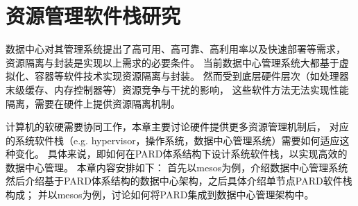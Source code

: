 

\chapter{资源管理软件栈研究}
\label{chap:prm}


数据中心对其管理系统提出了高可用、高可靠、高利用率以及快速部署等需求，
资源隔离与封装是实现以上需求的必要条件。
当前数据中心管理系统大都基于虚拟化、容器等软件技术实现资源隔离与封装。
然而受到底层硬件层次（如处理器末级缓存、内存控制器等）资源竞争与干扰的影响，
这些软件方法无法实现性能隔离，需要在硬件上提供资源隔离机制。


计算机的软硬需要协同工作，本章主要讨论硬件提供更多资源管理机制后，
对应的系统软件栈（e.g. hypervisor，操作系统，数据中心管理系统）需要如何适应这种变化。
具体来说，即如何在PARD体系结构下设计系统软件栈，以实现高效的数据中心管理。
本章内容安排如下：
首先以mesos为例，介绍数据中心管理系统
然后介绍基于PARD体系结构的数据中心架构，之后具体介绍单节点PARD软件栈构成；
并以mesos为例，讨论如何将PARD集成到数据中心管理架构中。


